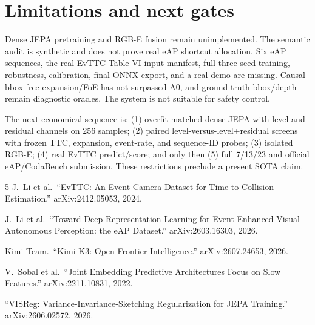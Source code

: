 \documentclass[10pt,twocolumn]{article}
\begin{document}
\section{Limitations and next gates}

Dense JEPA pretraining and RGB-E fusion remain unimplemented. The semantic audit
is synthetic and does not prove real eAP shortcut allocation. Six eAP sequences,
the real EvTTC Table-VI input manifest, full three-seed training, robustness,
calibration, final ONNX export, and a real demo are missing. Causal bbox-free
expansion/FoE has not surpassed A0, and ground-truth bbox/depth remain diagnostic
oracles. The system is not suitable for safety control.

The next economical sequence is: (1) overfit matched dense JEPA with level and
residual channels on 256 samples; (2) paired level-versus-level+residual screens
with frozen TTC, expansion, event-rate, and sequence-ID probes; (3) isolated RGB-E;
(4) real EvTTC predict/score; and only then (5) full 7/13/23 and official
eAP/CodaBench submission. These restrictions preclude a present SOTA claim.

\begin{thebibliography}{5}
J.~Li et al.\ ``EvTTC: An Event Camera Dataset for Time-to-Collision
Estimation.'' arXiv:2412.05053, 2024.

J.~Li et al.\ ``Toward Deep Representation Learning for Event-Enhanced Visual
Autonomous Perception: the eAP Dataset.'' arXiv:2603.16303, 2026.

Kimi Team.\ ``Kimi K3: Open Frontier Intelligence.'' arXiv:2607.24653, 2026.

V.~Sobal et al.\ ``Joint Embedding Predictive Architectures Focus on Slow
Features.'' arXiv:2211.10831, 2022.

``VISReg: Variance-Invariance-Sketching Regularization for JEPA Training.''
arXiv:2606.02572, 2026.
\end{thebibliography}
\end{document}
